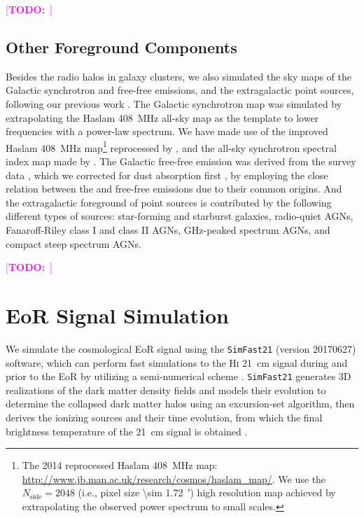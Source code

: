\documentclass[modern]{aastex61}
\newcommand{\R}[1]{\mathrm{#1}}
\newcommand{\Halpha}{\text{H$\alpha$}}
\newcommand{\Hi}{H\textsc{i}}
\newcommand{\TODO}[1]{\textcolor{magenta}{[\textbf{TODO:}~\uuline{#1}]}}
\begin{document}
\TODO{figures ...}

\subsection{Other Foreground Components}
\label{sec:fg-other}

Besides the radio halos in galaxy clusters, we also simulated the sky maps
of the Galactic synchrotron and free-free emissions, and the extragalactic
point sources, following our previous work \citep{wang2010}.
The Galactic synchrotron map was simulated by extrapolating the
Haslam \SI{408}{\MHz} all-sky map as the template to lower frequencies
with a power-law spectrum.
We have made use of the improved Haslam \SI{408}{\MHz} map\footnote{%
  The 2014 reprocessed Haslam \SI{408}{\MHz} map:
  \url{http://www.jb.man.ac.uk/research/cosmos/haslam_map/}.
  We use the $N_{\R{side}} = 2048$ (i.e., pixel size \SI{\sim 1.72}{\arcmin})
  high resolution map achieved by extrapolating the observed power spectrum
  to small scales.}
reprocessed by \citet{remazeilles2015},
and the all-sky synchrotron spectral index map made by \citet{giardino2002}.
The Galactic free-free emission was derived from the \Halpha{} survey data
\citep{finkbeiner2003}, which we corrected for dust absorption first
\citep{dickinson2003}, by employing the close relation between the \Halpha{}
and free-free emissions due to their common origins.
And the extragalactic foreground of point sources is contributed by the
following different types of sources: star-forming and starburst galaxies,
radio-quiet AGNs, Fanaroff-Riley class I and class II AGNs, GHz-peaked
spectrum AGNs, and compact steep spectrum AGNs.

\TODO{figures ...}


\section{EoR Signal Simulation}
\label{sec:eor-simulation}

We simulate the cosmological EoR signal using the \texttt{SimFast21}
(version 20170627) software, which can perform fast simulations to the
\Hi{} \SI{21}{\cm} signal during and prior to the EoR by utilizing a
semi-numerical scheme \citep{santos2010,hassan2016}.
\texttt{SimFast21} generates 3D realizations of the dark matter density
fields and models their evolution to determine the collapsed dark matter
halos using an excursion-set algorithm, then derives the ionizing sources
and their time evolution, from which the final brightness temperature of
the \SI{21}{\cm} signal is obtained \citep{santos2010}.
\end{document}
